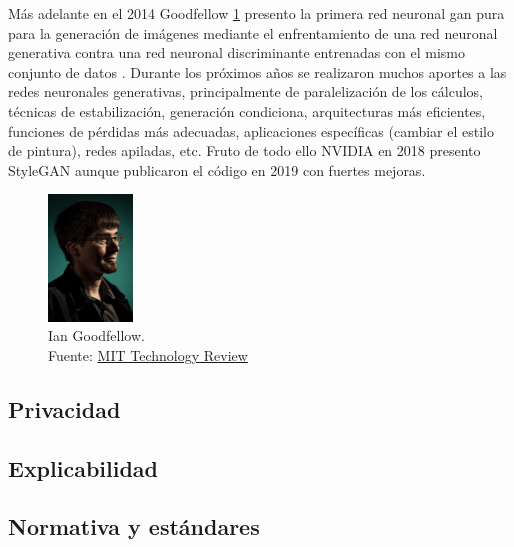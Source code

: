Más adelante en el 2014 {Goodfellow} \ref{fig:gan-ian-goodfellow} presento la primera red neuronal \acrshort{gan} pura para la generación de imágenes mediante el enfrentamiento de una red neuronal generativa contra una red neuronal discriminante entrenadas con el mismo conjunto de datos \cite{goodfellow2014generative}.
Durante los próximos años se realizaron muchos aportes a las redes neuronales generativas, principalmente de paralelización de los cálculos, técnicas de estabilización, generación condiciona, arquitecturas más eficientes, funciones de pérdidas más adecuadas, aplicaciones específicas (cambiar el estilo de pintura), redes apiladas, etc.
Fruto de todo ello {NVIDIA} en 2018 presento \gls{StyleGAN} \cite{karras2019stylebased} aunque publicaron el código en 2019 con fuertes mejoras.

\begin{figure}[H]
  \centering
  \includegraphics[width=0.2\textwidth]{figures/gan-goodfellow.png}
  \caption{Ian Goodfellow. \\Fuente: \href{https://www.technologyreview.es/s/10016/el-senor-de-las-gan-el-hombre-que-dio-imaginacion-las-maquinas}{MIT Technology Review}}
  \label{fig:gan-ian-goodfellow}
\end{figure}




\subsection{Privacidad}

\subsection{Explicabilidad}

\subsection{Normativa y estándares}

